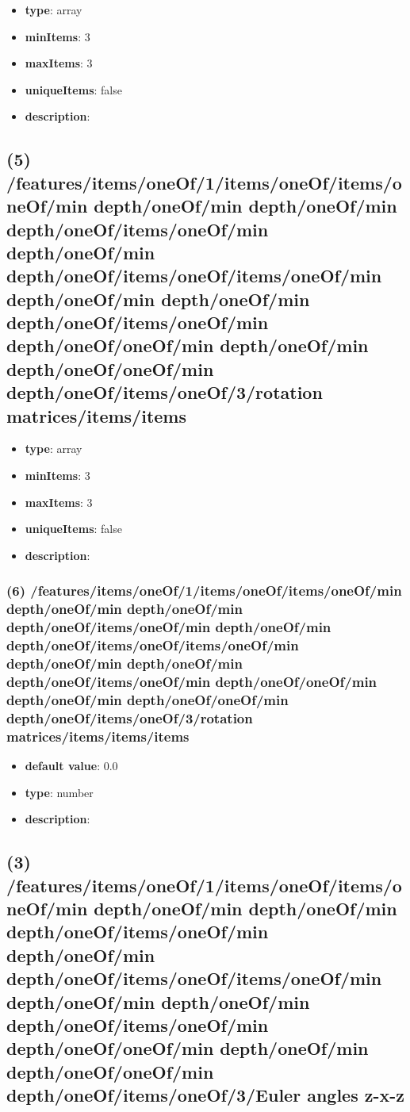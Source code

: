 \begin{itemize}[leftmargin=4em]\item {\bf type}: array
\item {\bf minItems}: 3
\item {\bf maxItems}: 3
\item {\bf uniqueItems}: false
\item {\bf description}: 
\end{itemize}\subsection{(5) /features/items/oneOf/1/items/oneOf/items/oneOf/min depth/oneOf/min depth/oneOf/min depth/oneOf/items/oneOf/min depth/oneOf/min depth/oneOf/items/oneOf/items/oneOf/min depth/oneOf/min depth/oneOf/min depth/oneOf/items/oneOf/min depth/oneOf/oneOf/min depth/oneOf/min depth/oneOf/oneOf/min depth/oneOf/items/oneOf/3/rotation matrices/items/items}
\begin{itemize}[leftmargin=5em]\item {\bf type}: array
\item {\bf minItems}: 3
\item {\bf maxItems}: 3
\item {\bf uniqueItems}: false
\item {\bf description}: 
\end{itemize}\subsubsection{(6) /features/items/oneOf/1/items/oneOf/items/oneOf/min depth/oneOf/min depth/oneOf/min depth/oneOf/items/oneOf/min depth/oneOf/min depth/oneOf/items/oneOf/items/oneOf/min depth/oneOf/min depth/oneOf/min depth/oneOf/items/oneOf/min depth/oneOf/oneOf/min depth/oneOf/min depth/oneOf/oneOf/min depth/oneOf/items/oneOf/3/rotation matrices/items/items/items}
\begin{itemize}[leftmargin=6em]\item {\bf default value}: 0.0
\item {\bf type}: number
\item {\bf description}: 
\end{itemize}\subsection{(3) /features/items/oneOf/1/items/oneOf/items/oneOf/min depth/oneOf/min depth/oneOf/min depth/oneOf/items/oneOf/min depth/oneOf/min depth/oneOf/items/oneOf/items/oneOf/min depth/oneOf/min depth/oneOf/min depth/oneOf/items/oneOf/min depth/oneOf/oneOf/min depth/oneOf/min depth/oneOf/oneOf/min depth/oneOf/items/oneOf/3/Euler angles z-x-z}
